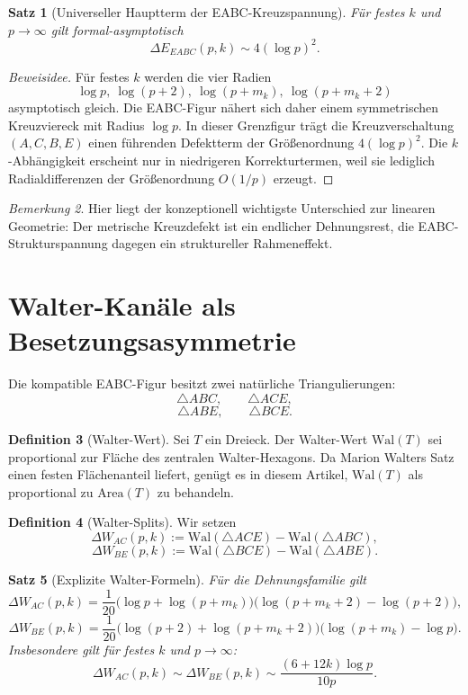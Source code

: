 \documentclass[11pt,a4paper]{article}
\newtheorem{satz}{Satz}
\theoremstyle{definition}
\newtheorem{definition}[satz]{Definition}
\theoremstyle{remark}
\newtheorem{bemerkung}[satz]{Bemerkung}
\newcommand{\Area}{\mathrm{Area}}
\newcommand{\Wal}{\mathrm{Wal}}
\begin{document}
\begin{satz}[Universeller Hauptterm der EABC-Kreuzspannung]
Für festes $k$ und $p\to\infty$ gilt formal-asymptotisch
\[
\Delta E_{EABC}(p,k)\sim 4(\log p)^2.
\]
\end{satz}

\begin{proof}[Beweisidee]
Für festes $k$ werden die vier Radien
\[
\log p,\ \log(p+2),\ \log(p+m_k),\ \log(p+m_k+2)
\]
asymptotisch gleich. Die EABC-Figur nähert sich daher einem symmetrischen Kreuzviereck mit Radius $\log p$. In dieser Grenzfigur trägt die Kreuzverschaltung $(A,C,B,E)$ einen führenden Defektterm der Größenordnung $4(\log p)^2$. Die $k$-Abhängigkeit erscheint nur in niedrigeren Korrekturtermen, weil sie lediglich Radialdifferenzen der Größenordnung $O(1/p)$ erzeugt.
\end{proof}

\begin{bemerkung}
Hier liegt der konzeptionell wichtigste Unterschied zur linearen Geometrie: Der metrische Kreuzdefekt ist ein endlicher Dehnungsrest, die EABC-Strukturspannung dagegen ein struktureller Rahmeneffekt.
\end{bemerkung}

\section{Walter-Kanäle als Besetzungsasymmetrie}

Die kompatible EABC-Figur besitzt zwei natürliche Triangulierungen:
\[
\triangle ABC,\qquad \triangle ACE,
\]
\[
\triangle ABE,\qquad \triangle BCE.
\]

\begin{definition}[Walter-Wert]
Sei $T$ ein Dreieck. Der Walter-Wert $\Wal(T)$ sei proportional zur Fläche des zentralen Walter-Hexagons. Da Marion Walters Satz einen festen Flächenanteil liefert, genügt es in diesem Artikel, $\Wal(T)$ als proportional zu $\Area(T)$ zu behandeln.
\end{definition}

\begin{definition}[Walter-Splits]
Wir setzen
\[
\Delta W_{AC}(p,k):=\Wal(\triangle ACE)-\Wal(\triangle ABC),
\]
\[
\Delta W_{BE}(p,k):=\Wal(\triangle BCE)-\Wal(\triangle ABE).
\]
\end{definition}

\begin{satz}[Explizite Walter-Formeln]
Für die Dehnungsfamilie gilt
\[
\Delta W_{AC}(p,k)
=
\frac{1}{20}\bigl(\log p+\log(p+m_k)\bigr)\bigl(\log(p+m_k+2)-\log(p+2)\bigr),
\]
\[
\Delta W_{BE}(p,k)
=
\frac{1}{20}\bigl(\log(p+2)+\log(p+m_k+2)\bigr)\bigl(\log(p+m_k)-\log p\bigr).
\]
Insbesondere gilt für festes $k$ und $p\to\infty$:
\[
\Delta W_{AC}(p,k)\sim \Delta W_{BE}(p,k)\sim \frac{(6+12k)\log p}{10p}.
\]
\end{satz}
\end{document}
